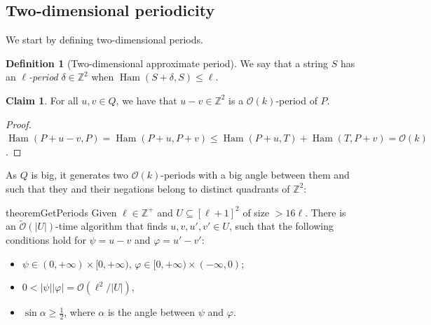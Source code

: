 \documentclass[11pt, letterpaper]{article}
\theoremstyle{plain}
\theoremstyle{definition}
\newtheorem{definition}{Definition}
\newtheorem{claim}{Claim}
\theoremstyle{remark}
\newcommand{\Z}{\mathbb{Z}}
\renewcommand{\O}{\mathcal{O}}
\newcommand{\tO}{\tilde{\mathcal{O}}}
\renewcommand{\phi}{\varphi}
\DeclareMathOperator*{\Ham}{Ham}
\newcommand{\absolute}[1]{\left\lvert#1\right\rvert}
\begin{document}
\subsection{Two-dimensional periodicity} \label{periodicity_section}
We start by defining two-dimensional periods.



\begin{definition}[Two-dimensional approximate period]
We say that a string $S$ has an \emph{$\ell$-period} $\delta \in \Z^2$ when $\Ham(S + \delta, S) \le \ell$.
\end{definition}


\begin{claim} \label{periodicity_lemma}
For all $u, v \in Q$, we have that $u - v \in \Z^2$ is a $\O(k)$-period of $P$.
\end{claim}	
\begin{proof}
$\Ham(P + u - v, P) = \Ham(P + u, P + v) \le \Ham(P + u, T) + \Ham(T,P + v) = \O(k)$.
\end{proof}

As $Q$ is big, it generates two $\O(k)$-periods with a big angle between them and such that they and their negations belong to distinct quadrants of $\Z^2$: 

\begin{restatable*}{theorem}{GetPeriods}\label{get_periods}
Given $\ell \in \Z^+$ and $U \subseteq [\ell + 1]^2$ of size $> 16\ell$. There is an $\tO(\absolute{U})$-time algorithm that finds $u, v, u', v' \in U$, such that the following conditions hold for $\psi = u - v$ and $\phi = u' - v'$:
	\begin{itemize}
		\item $\psi \in (0, +\infty) \times [0, +\infty)$, $\phi \in [0, +\infty) \times (-\infty, 0)$;
		\item $0 < \absolute{\psi}\absolute{\phi} = \O(\ell^2 / \absolute{U})$,
		\item $\sin \alpha \ge \frac{1}{2}$, where $\alpha$ is the angle between $\psi$ and $\phi$.
	\end{itemize}
\end{restatable*}
\end{document}
